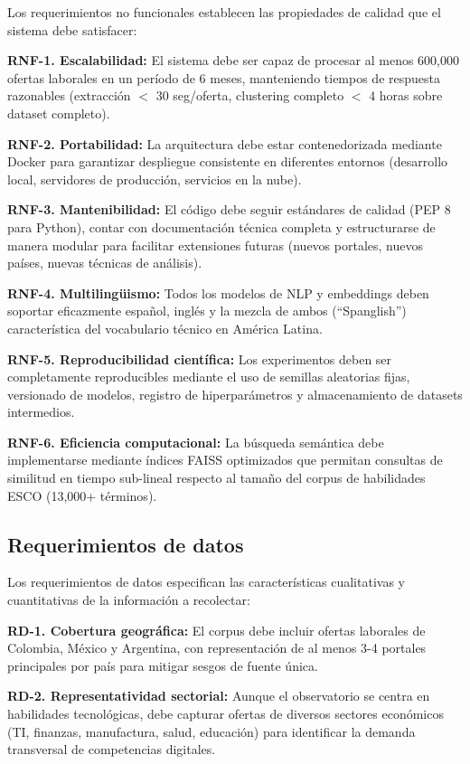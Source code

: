 Los requerimientos no funcionales establecen las propiedades de calidad que el sistema debe satisfacer:

\textbf{RNF-1. Escalabilidad:} El sistema debe ser capaz de procesar al menos 600,000 ofertas laborales en un período de 6 meses, manteniendo tiempos de respuesta razonables (extracción $<$ 30 seg/oferta, clustering completo $<$ 4 horas sobre dataset completo).

\textbf{RNF-2. Portabilidad:} La arquitectura debe estar contenedorizada mediante Docker para garantizar despliegue consistente en diferentes entornos (desarrollo local, servidores de producción, servicios en la nube).

\textbf{RNF-3. Mantenibilidad:} El código debe seguir estándares de calidad (PEP 8 para Python), contar con documentación técnica completa y estructurarse de manera modular para facilitar extensiones futuras (nuevos portales, nuevos países, nuevas técnicas de análisis).

\textbf{RNF-4. Multilingüismo:} Todos los modelos de NLP y embeddings deben soportar eficazmente español, inglés y la mezcla de ambos (``Spanglish'') característica del vocabulario técnico en América Latina.

\textbf{RNF-5. Reproducibilidad científica:} Los experimentos deben ser completamente reproducibles mediante el uso de semillas aleatorias fijas, versionado de modelos, registro de hiperparámetros y almacenamiento de datasets intermedios.

\textbf{RNF-6. Eficiencia computacional:} La búsqueda semántica debe implementarse mediante índices FAISS optimizados que permitan consultas de similitud en tiempo sub-lineal respecto al tamaño del corpus de habilidades ESCO (13,000+ términos).

\subsection{Requerimientos de datos}

Los requerimientos de datos especifican las características cualitativas y cuantitativas de la información a recolectar:

\textbf{RD-1. Cobertura geográfica:} El corpus debe incluir ofertas laborales de Colombia, México y Argentina, con representación de al menos 3-4 portales principales por país para mitigar sesgos de fuente única.

\textbf{RD-2. Representatividad sectorial:} Aunque el observatorio se centra en habilidades tecnológicas, debe capturar ofertas de diversos sectores económicos (TI, finanzas, manufactura, salud, educación) para identificar la demanda transversal de competencias digitales.

